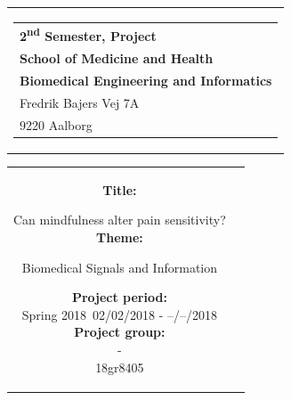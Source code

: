 % 
\thispagestyle{empty}
\begin{titlepage}
\begin{nopagebreak}
{\samepage 

\begin{tabular}{r}
\parbox{\textwidth}{  
\hfill \hspace{2cm} \parbox{8cm}{\begin{tabular}{l} %
{\small \textbf{\textcolor{aaublue}{{2\textsuperscript{nd} Semester, Project}}}}\\
{\small \textbf{\textcolor{aaublue}{School of Medicine and Health}}}\\
{\small \textbf{\textcolor{aaublue}{Biomedical Engineering and Informatics}}}\\
{\small \textcolor{aaublue}{Fredrik Bajers Vej 7A}} \\
{\small \textcolor{aaublue}{9220 Aalborg}} \\
\end{tabular}}}
\end{tabular}

\begin{tabular}{cc}
\parbox{7cm}{

\textbf{Title:}

Can mindfulness alter pain sensitivity? \\ 

\textbf{Theme:}

\small{
 Biomedical Signals and Information\\
}


\parbox{8cm}{


\textbf{Project period:}\\
Spring 2018\
02/02/2018 - --/--/2018\\
   
\textbf{Project group: }\\
-\\ 18gr8405%
  
}}
\end{tabular}}
\end{nopagebreak}
\end{titlepage}
